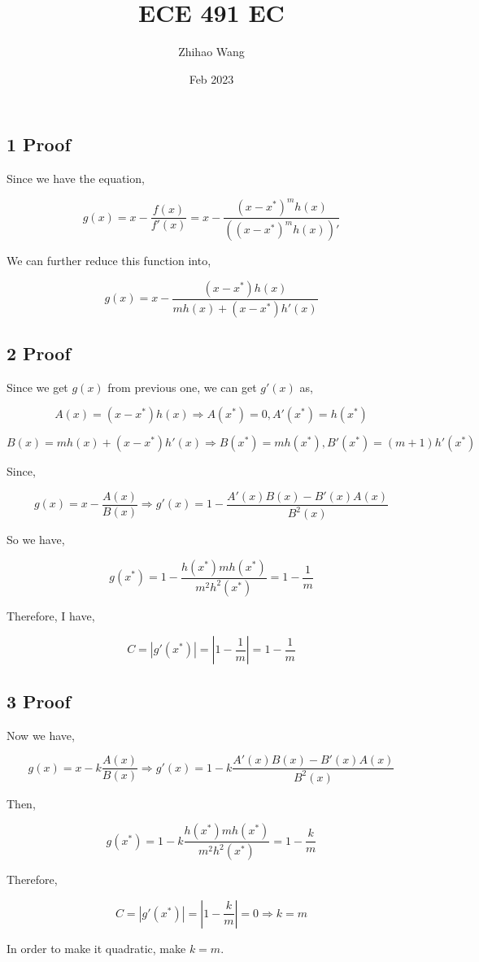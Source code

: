 \documentclass{article}
\title{ECE 491 EC}
\author{Zhihao Wang}
\date{Feb 2023}
\def\implies{\Longrightarrow}
\begin{document}
\maketitle

\subsection*{1 Proof}

Since we have the equation,

$$g(x) = x - \frac{f(x)}{f'(x)} = x - \frac{(x - x^*)^mh(x)}{((x - x^*)^mh(x))'}$$

We can further reduce this function into,

$$g(x) = x - \frac{(x - x^*)h(x)}{mh(x) + (x - x^*)h'(x)}$$

\subsection*{2 Proof}

Since we get $g(x)$ from previous one, we can get $g'(x)$ as,

$$A(x) = (x - x^*)h(x) \implies A(x^*) = 0, A'(x^*) = h(x^*)$$

$$B(x) = mh(x) + (x - x^*)h'(x) \implies B(x^*) = mh(x^*), B'(x^*) = (m + 1)h'(x^*)$$

Since,

$$g(x) = x - \frac{A(x)}{B(x)} \implies g'(x) = 1 - \frac{A'(x)B(x) - B'(x)A(x)}{B^2(x)}$$

So we have,

$$g(x^*) = 1 - \frac{h(x^*)mh(x^*)}{m^2h^2(x^*)} = 1 - \frac{1}{m}$$

Therefore, I have,

$$C = |g'(x^*)| = |1 - \frac{1}{m}| = 1 - \frac{1}{m} $$

\subsection*{3 Proof}

Now we have,

$$g(x) = x - k\frac{A(x)}{B(x)} \implies g'(x) = 1 - k\frac{A'(x)B(x) - B'(x)A(x)}{B^2(x)}$$

Then,

$$g(x^*) = 1 - k\frac{h(x^*)mh(x^*)}{m^2h^2(x^*)} = 1 - \frac{k}{m}$$

Therefore, 

$$C = |g'(x^*)| = |1 - \frac{k}{m}|  = 0 \implies  k = m$$

In order to make it quadratic, make $k = m$. 
\end{document}
